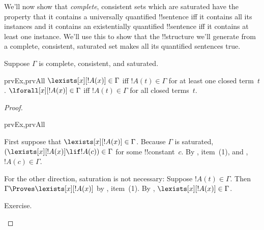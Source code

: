 \begin{explain}
We'll now show that \emph{complete}, consistent sets which are
saturated have the property that it contains a
  universally quantified !!{sentence} iff it contains all its
  instances and it contains an
  existentially quantified !!{sentence} iff it contains at least one
  instance. We'll use this to show that the !!{structure} we'll
generate from a complete, consistent, saturated set makes all its
quantified sentences true.
\end{explain}

\begin{prop}
Suppose $\Gamma$ is complete, consistent, and saturated.
\begin{tagenumerate}{prvEx,prvAll}
$\lexists[x][!A(x)] \in \Gamma$ iff $!A(t) \in \Gamma$
  for at least one closed term~$t$.
$\lforall[x][!A(x)] \in \Gamma$ iff $!A(t) \in \Gamma$
  for all closed terms~$t$.
\end{tagenumerate}
\end{prop}

\begin{proof}
  \begin{tagenumerate}{prvEx,prvAll}
  
    First suppose that $\lexists[x][!A(x)]
      \in \Gamma$.  Because $\Gamma$ is saturated,
      $(\lexists[x][!A(x)] \lif !A(c)) \in \Gamma$ for some
      !!{constant}~$c$. By
      , item~(1),
      and , $!A(c)
      \in \Gamma$.

    For the other direction, saturation is not necessary: Suppose
    $!A(t) \in \Gamma$. Then $\Gamma \Proves \lexists[x][!A(x)]$ by
      , item~(1). By
    ,
    $\lexists[x][!A(x)] \in \Gamma$.
  
    Exercise.
  \end{tagenumerate}
\end{proof}







